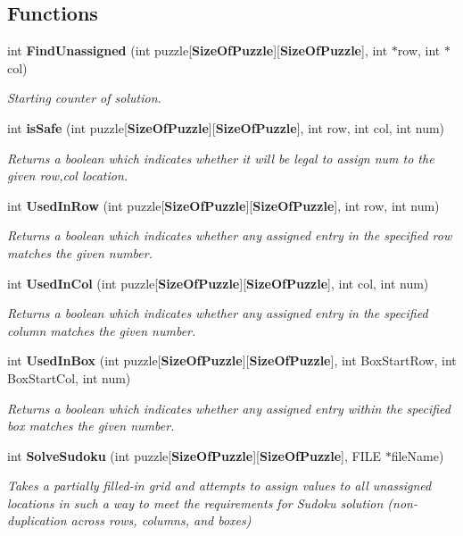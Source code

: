\subsection*{Functions}
\begin{DoxyCompactItemize}
\item 
int {\bf Find\+Unassigned} (int puzzle[{\bf Size\+Of\+Puzzle}][{\bf Size\+Of\+Puzzle}], int $\ast$row, int $\ast$col)
\begin{DoxyCompactList}\small\item\em Starting counter of solution. \end{DoxyCompactList}\item 
int {\bf is\+Safe} (int puzzle[{\bf Size\+Of\+Puzzle}][{\bf Size\+Of\+Puzzle}], int row, int col, int num)
\begin{DoxyCompactList}\small\item\em Returns a boolean which indicates whether it will be legal to assign num to the given row,col location. \end{DoxyCompactList}\item 
int {\bf Used\+In\+Row} (int puzzle[{\bf Size\+Of\+Puzzle}][{\bf Size\+Of\+Puzzle}], int row, int num)
\begin{DoxyCompactList}\small\item\em Returns a boolean which indicates whether any assigned entry in the specified row matches the given number. \end{DoxyCompactList}\item 
int {\bf Used\+In\+Col} (int puzzle[{\bf Size\+Of\+Puzzle}][{\bf Size\+Of\+Puzzle}], int col, int num)
\begin{DoxyCompactList}\small\item\em Returns a boolean which indicates whether any assigned entry in the specified column matches the given number. \end{DoxyCompactList}\item 
int {\bf Used\+In\+Box} (int puzzle[{\bf Size\+Of\+Puzzle}][{\bf Size\+Of\+Puzzle}], int Box\+Start\+Row, int Box\+Start\+Col, int num)
\begin{DoxyCompactList}\small\item\em Returns a boolean which indicates whether any assigned entry within the specified box matches the given number. \end{DoxyCompactList}\item 
int {\bf Solve\+Sudoku} (int puzzle[{\bf Size\+Of\+Puzzle}][{\bf Size\+Of\+Puzzle}], F\+I\+LE $\ast$file\+Name)
\begin{DoxyCompactList}\small\item\em Takes a partially filled-\/in grid and attempts to assign values to all unassigned locations in such a way to meet the requirements for Sudoku solution (non-\/duplication across rows, columns, and boxes) \end{DoxyCompactList}\end{DoxyCompactItemize}
